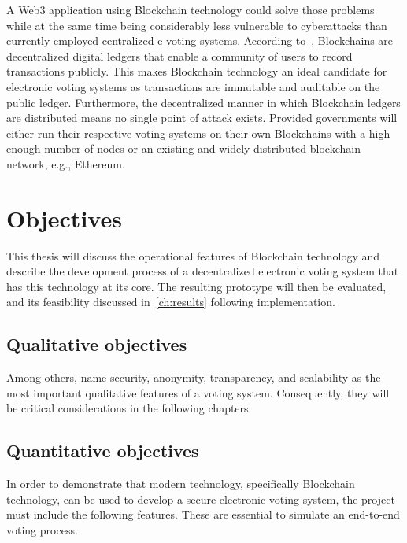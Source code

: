 A \Gls{Web3} application using \gls{Blockchain} technology could solve those problems while at the same time being considerably less vulnerable to cyberattacks than currently employed centralized e-voting systems.
According to~\textcite{yaga_blockchain_2018}, \glspl{Blockchain} are decentralized digital ledgers that enable a community of users to record transactions publicly.
This makes \gls{Blockchain} technology an ideal candidate for electronic voting systems as transactions are immutable and auditable on the public ledger.
Furthermore, the decentralized manner in which \gls{Blockchain} ledgers are distributed means no single point of attack exists.
Provided governments will either run their respective voting systems on their own \glspl{Blockchain} with a high enough number of nodes or an existing and widely distributed blockchain network, e.g., Ethereum.

\section{Objectives}\label{sec:objectives}

This thesis will discuss the operational features of \gls{Blockchain} technology and describe the development process of a decentralized electronic voting system that has this technology at its core.
The resulting prototype will then be evaluated, and its feasibility discussed in~\cref{ch:results} following implementation.

\subsection{Qualitative objectives}\label{subsec:qualitative-objectives}

Among others, \textcites[9-11]{jafar_blockchain_2021}[3]{diaz-santiso_e-voting_2021}{lowry_desirable_2009}[10-12]{tas_systematic_2020} name security, anonymity, transparency, and scalability as the most important qualitative features of a voting system.
Consequently, they will be critical considerations in the following chapters.

\subsection{Quantitative objectives}\label{subsec:quantitative-objectives}

In order to demonstrate that modern technology, specifically \gls{Blockchain} technology, can be used to develop a secure electronic voting system, the project must include the following features.
These are essential to simulate an end-to-end voting process.

